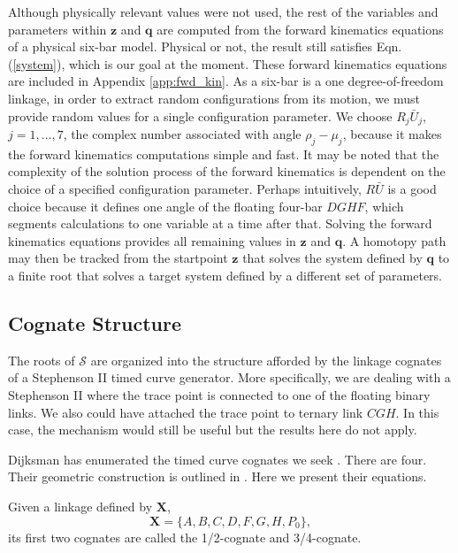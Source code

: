 \documentclass[journal]{IEEEtran}
\def\*#1{\bar{#1}} %
\begin{document}
Although physically relevant values were not used, the rest of the variables and parameters within $\mathbf{z}$ and $\mathbf{q}$ are computed from the forward kinematics equations of a physical six-bar model.
Physical or not, the result still satisfies Eqn. (\ref{system}), which is our goal at the moment.
These forward kinematics equations are included in Appendix \ref{app:fwd_kin}.
As a six-bar is a one degree-of-freedom linkage, in order to extract random configurations from its motion, we must provide random values for a single configuration parameter.
We choose $R_j\*U_j$, $j=1,\ldots,7$, the complex number associated with angle $\rho_j-\mu_j$, because it makes the forward kinematics computations simple and fast.
It may be noted that the complexity of the solution process of the forward kinematics is dependent on the choice of a specified configuration parameter.
Perhaps intuitively, $R\*U$ is a good choice because it defines one angle of the floating four-bar $DGHF$, which segments calculations to one variable at a time after that.
Solving the forward kinematics equations provides all remaining values in $\mathbf{z}$ and $\mathbf{q}$.
A homotopy path may then be tracked from the startpoint $\mathbf{z}$ that solves the system defined by $\mathbf{q}$ to a finite root that solves a target system defined by a different set of parameters.




\subsection{Cognate Structure}
\label{sec:cognates}

The roots of $\mathcal{S}$ are organized into the structure afforded by the linkage cognates of a Stephenson II timed curve generator.
More specifically, we are dealing with a Stephenson II where the trace point is connected to one of the floating binary links.
We also could have attached the trace point to ternary link $CGH$.
In this case, the mechanism would still be useful but the results here do not apply.

Dijksman has enumerated the timed curve cognates we seek \cite[pg.~183]{dijksmanMotionGeometryMechanisms1976}.  There are four.
Their geometric construction is outlined in \cite{dijksmanSixBarCognatesStephenson1971}.
Here we present their equations.


Given a linkage defined by $\mathbf{X}$,
\begin{equation}
\mathbf{X} = \{ A, B, C, D, F, G, H, P_0 \},
\end{equation}
its first two cognates are called the 1/2-cognate and 3/4-cognate.
\end{document}
